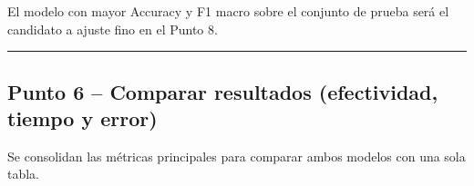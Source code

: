 \documentclass[
]{article}
\begin{document}
El modelo con mayor Accuracy y F1 macro sobre el conjunto de prueba será
el candidato a ajuste fino en el Punto 8.

\begin{center}\rule{0.5\linewidth}{0.5pt}\end{center}

\hypertarget{punto-6-comparar-resultados-efectividad-tiempo-y-error}{%
\subsection{Punto 6 -- Comparar resultados (efectividad, tiempo y
error)}\label{punto-6-comparar-resultados-efectividad-tiempo-y-error}}

Se consolidan las métricas principales para comparar ambos modelos con
una sola tabla.
\end{document}
